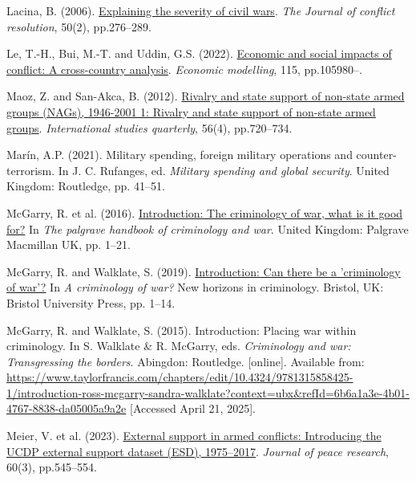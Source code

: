 \documentclass[
]{article}
\newlength{\cslhangindent}
\newenvironment{CSLReferences}[2] %
 {\begin{list}{}{%
  \setlength{\itemindent}{0pt}
  \setlength{\leftmargin}{0pt}
  \setlength{\parsep}{0pt}
  \ifodd #1
   \setlength{\leftmargin}{\cslhangindent}
   \setlength{\itemindent}{-1\cslhangindent}
  \fi
  \setlength{\itemsep}{#2\baselineskip}}}
 {\end{list}}
\begin{document}
\begin{CSLReferences}{0}{1}
Lacina, B. (2006).
\href{https://doi.org/10.1177/0022002705284828}{Explaining the severity
of civil wars}. \emph{The Journal of conflict resolution}, 50(2),
pp.276--289.

Le, T.-H., Bui, M.-T. and Uddin, G.S. (2022).
\href{https://doi.org/10.1016/j.econmod.2022.105980}{Economic and social
impacts of conflict: A cross-country analysis}. \emph{Economic
modelling}, 115, pp.105980--.

Maoz, Z. and San-Akca, B. (2012).
\href{https://doi.org/10.1111/j.1468-2478.2012.00759.x}{Rivalry and
state support of non-state armed groups (NAGs), 1946-2001 1: Rivalry and
state support of non-state armed groups}. \emph{International studies
quarterly}, 56(4), pp.720--734.

Marín, A.P. (2021). Military spending, foreign military operations and
counter-terrorism. In J. C. Rufanges, ed. \emph{Military spending and
global security}. United Kingdom: Routledge, pp. 41--51.

McGarry, R. et al. (2016).
\href{https://doi.org/10.1057/978-1-137-43170-7_1}{Introduction: The
criminology of war, what is it good for?} In \emph{The palgrave handbook
of criminology and war}. United Kingdom: Palgrave Macmillan UK, pp.
1--21.

McGarry, R. and Walklate, S. (2019).
\href{https://doi.org/10.51952/9781529202618.ch001}{Introduction: Can
there be a 'criminology of war'?} In \emph{A criminology of war?} New
horizons in criminology. Bristol, UK: Bristol University Press, pp.
1--14.

McGarry, R. and Walklate, S. (2015). Introduction: Placing war within
criminology. In S. Walklate \& R. McGarry, eds. \emph{Criminology and
war: Transgressing the borders}. Abingdon: Routledge. {[}online{]}.
Available from:
\url{https://www.taylorfrancis.com/chapters/edit/10.4324/9781315858425-1/introduction-ross-mcgarry-sandra-walklate?context=ubx&refId=6b6a1a3e-4b01-4767-8838-da05005a9a2e}
{[}Accessed April 21, 2025{]}.

Meier, V. et al. (2023).
\href{https://doi.org/10.1177/00223433221079864}{External support in
armed conflicts: Introducing the UCDP external support dataset (ESD),
1975--2017}. \emph{Journal of peace research}, 60(3), pp.545--554.


\end{CSLReferences}
\end{document}
